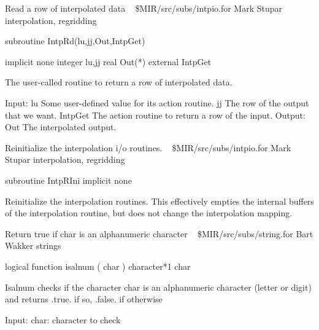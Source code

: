 %
\noindent Read a row of interpolated data
\newline \ 
\newline {} \$MIR/src/subs/intpio.for
\newline {} Mark Stupar
\newline {} interpolation, regridding
\par{\tenpoint
{\eightpoint\begintt
        subroutine IntpRd(lu,jj,Out,IntpGet)

        implicit none
        integer lu,jj
        real Out(*)
        external IntpGet

  The user-called routine to return a row of interpolated data.

  Input:
    lu         Some user-defined value for its action routine.
    jj         The row of the output that we want.
    IntpGet    The action routine to return a row of the input.
  Output:
    Out        The interpolated output.
\endtt}
\par}
%
\noindent Reinitialize the interpolation i/o routines.
\newline \ 
\newline {} \$MIR/src/subs/intpio.for
\newline {} Mark Stupar
\newline \abox{Keywords:} interpolation, regridding
\par{\tenpoint
{\eightpoint\begintt
        subroutine IntpRIni
        implicit none

  Reinitialize the interpolation routines. This effectively empties the
  internal buffers of the interpolation routine, but does not change
  the interpolation mapping.
\endtt}
\par}
%
\noindent Return true if char is an alphanumeric character
\newline \ 
\newline {} \$MIR/src/subs/string.for
\newline \abox{Responsible:} Bart Wakker
\newline {} strings
\par{\tenpoint
{\eightpoint\begintt
      logical function isalnum ( char )
      character*1 char

 Isalnum checks if the character char is an alphanumeric character (letter or
 digit) and returns .true. if so, .false. if otherwise

 Input:
   char:    character to check
\endtt}
\par}
